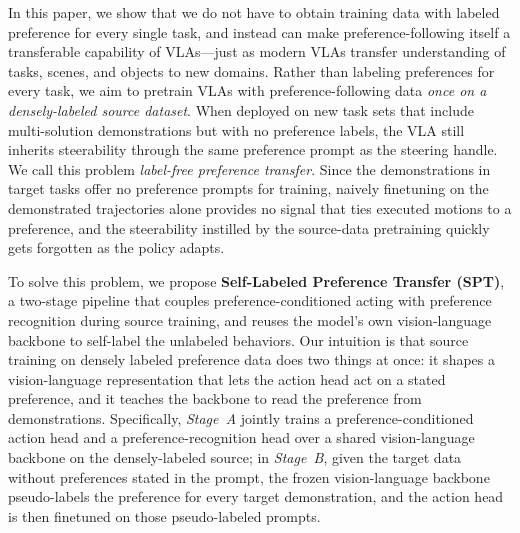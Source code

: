 \documentclass{article}
\begin{document}
In this paper, we show that we do not have to obtain training data with labeled preference for every single task, and instead can make preference-following itself a transferable capability of VLAs---just as modern VLAs transfer understanding of tasks, scenes, and objects to new domains. 
Rather than labeling preferences for every task, we aim to pretrain VLAs with preference-following data \emph{once on a densely-labeled source dataset}.
When deployed on new task sets that include multi-solution demonstrations but with no preference labels, the VLA still inherits steerability through the same preference prompt as the steering handle. 
We call this problem \emph{label-free preference transfer}. 
Since the demonstrations in target tasks offer no preference prompts for training, naively finetuning on the demonstrated trajectories alone provides no signal that ties executed motions to a preference, and the steerability instilled by the source-data pretraining quickly gets forgotten as the policy adapts.


To solve this problem, we propose \textbf{Self-Labeled Preference Transfer (SPT)}, a two-stage pipeline that couples preference-conditioned acting with preference recognition during source training, and reuses the model's own vision-language backbone to self-label the unlabeled behaviors. Our intuition is that source training on densely labeled preference data does two things at once: it shapes a vision-language representation that lets the action head act on a stated preference, and it teaches the backbone to read the preference from demonstrations. Specifically, \emph{Stage~A} jointly trains a preference-conditioned action head and a preference-recognition head over a shared vision-language backbone on the densely-labeled source;
in \emph{Stage~B}, given the target data without preferences stated in the prompt, the frozen vision-language backbone pseudo-labels the preference for every target demonstration, and the action head is then finetuned on those pseudo-labeled prompts.
\end{document}
